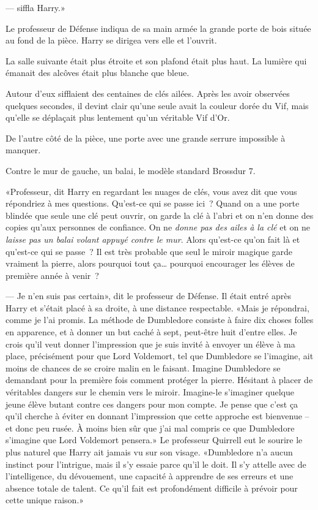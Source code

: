 ---  siffla Harry.»

Le professeur de Défense indiqua de sa main armée la grande porte de bois située au fond de la pièce. Harry se dirigea vers elle et l'ouvrit.

\later

La salle suivante était plus étroite et son plafond était plus haut. La lumière qui émanait des alcôves était plus blanche que bleue.

Autour d'eux sifflaient des centaines de clés ailées. Après les avoir observées quelques secondes, il devint clair qu'une seule avait la couleur dorée du Vif, mais qu'elle se déplaçait plus lentement qu'un véritable Vif d'Or.

De l'autre côté de la pièce, une porte avec une grande serrure impossible à manquer.

Contre le mur de gauche, un balai, le modèle standard Brossdur 7.

«Professeur, dit Harry en regardant les nuages de clés, vous avez dit que vous répondriez à mes questions. Qu'est-ce qui se passe ici~? Quand on a une porte blindée que seule une clé peut ouvrir, on garde la clé à l'abri et on n'en donne des copies qu'aux personnes de confiance. On ne \emph{donne pas des ailes à la clé} et on ne \emph{laisse pas un balai volant appuyé contre le mur}. Alors qu'est-ce qu'on fait là et qu'est-ce qui se passe~? Il est très probable que seul le miroir magique garde vraiment la pierre, alors pourquoi tout ça… pourquoi encourager les élèves de première année à venir~?

--- Je n'en suis pas certain», dit le professeur de Défense. Il était entré après Harry et s'était placé à sa droite, à une distance respectable. «Mais je répondrai, comme je l'ai promis. La méthode de Dumbledore consiste à faire dix choses folles en apparence, et à donner un but caché à sept, peut-être huit d'entre elles. Je crois qu'il veut donner l'impression que je suis invité à envoyer un élève à ma place, précisément pour que Lord Voldemort, tel que Dumbledore se l'imagine, ait moins de chances de se croire malin en le faisant. Imagine Dumbledore se demandant pour la première fois comment protéger la pierre. Hésitant à placer de véritables dangers sur le chemin vers le miroir. Imagine-le s'imaginer quelque jeune élève butant contre ces dangers pour mon compte. Je pense que c'est ça qu'il cherche à éviter en donnant l'impression que cette approche est bienvenue -- et donc peu rusée. À moins bien sûr que j'ai mal compris ce que Dumbledore s'imagine que Lord Voldemort pensera.» Le professeur Quirrell eut le sourire le plus naturel que Harry ait jamais vu sur son visage. «Dumbledore n'a aucun instinct pour l'intrigue, mais il s'y essaie parce qu'il le doit. Il s'y attelle avec de l'intelligence, du dévouement, une capacité à apprendre de ses erreurs et une absence totale de talent. Ce qu'il fait est profondément difficile à prévoir pour cette unique raison.»

